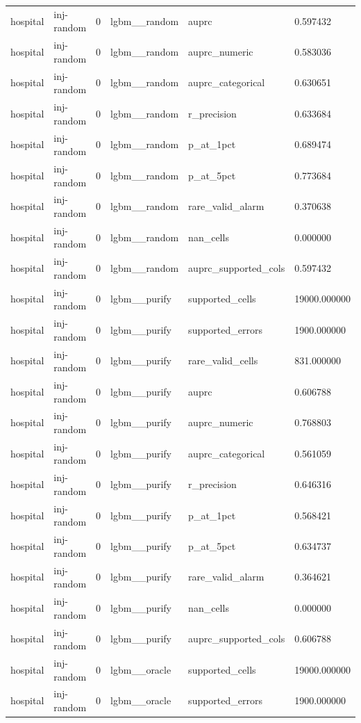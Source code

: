 \begin{tabular}{llllll}
hospital & inj-random & 0 & lgbm\_\_random & auprc & 0.597432 \\
hospital & inj-random & 0 & lgbm\_\_random & auprc\_numeric & 0.583036 \\
hospital & inj-random & 0 & lgbm\_\_random & auprc\_categorical & 0.630651 \\
hospital & inj-random & 0 & lgbm\_\_random & r\_precision & 0.633684 \\
hospital & inj-random & 0 & lgbm\_\_random & p\_at\_1pct & 0.689474 \\
hospital & inj-random & 0 & lgbm\_\_random & p\_at\_5pct & 0.773684 \\
hospital & inj-random & 0 & lgbm\_\_random & rare\_valid\_alarm & 0.370638 \\
hospital & inj-random & 0 & lgbm\_\_random & nan\_cells & 0.000000 \\
hospital & inj-random & 0 & lgbm\_\_random & auprc\_supported\_cols & 0.597432 \\
hospital & inj-random & 0 & lgbm\_\_purify & supported\_cells & 19000.000000 \\
hospital & inj-random & 0 & lgbm\_\_purify & supported\_errors & 1900.000000 \\
hospital & inj-random & 0 & lgbm\_\_purify & rare\_valid\_cells & 831.000000 \\
hospital & inj-random & 0 & lgbm\_\_purify & auprc & 0.606788 \\
hospital & inj-random & 0 & lgbm\_\_purify & auprc\_numeric & 0.768803 \\
hospital & inj-random & 0 & lgbm\_\_purify & auprc\_categorical & 0.561059 \\
hospital & inj-random & 0 & lgbm\_\_purify & r\_precision & 0.646316 \\
hospital & inj-random & 0 & lgbm\_\_purify & p\_at\_1pct & 0.568421 \\
hospital & inj-random & 0 & lgbm\_\_purify & p\_at\_5pct & 0.634737 \\
hospital & inj-random & 0 & lgbm\_\_purify & rare\_valid\_alarm & 0.364621 \\
hospital & inj-random & 0 & lgbm\_\_purify & nan\_cells & 0.000000 \\
hospital & inj-random & 0 & lgbm\_\_purify & auprc\_supported\_cols & 0.606788 \\
hospital & inj-random & 0 & lgbm\_\_oracle & supported\_cells & 19000.000000 \\
hospital & inj-random & 0 & lgbm\_\_oracle & supported\_errors & 1900.000000 \\

\end{tabular}
